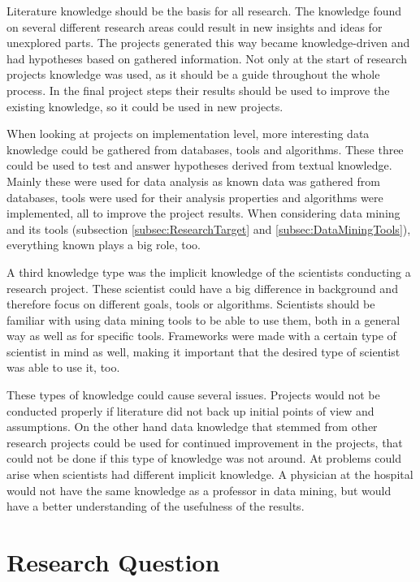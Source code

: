 \documentclass[10pt,a4paper]{article}
\begin{document}
	Literature knowledge should be the basis for all research. The knowledge found on several different research areas could result in new insights and ideas for unexplored parts. The projects generated this way became knowledge-driven and had hypotheses based on gathered information.\cite{bellazzi2011data} Not only at the start of research projects knowledge was used, as it should be a guide throughout the whole process. In the final project steps their results should be used to improve the existing knowledge, so it could be used in new projects.\cite{zupan2006knowledge}
	
	When looking at projects on implementation level, more interesting data knowledge could be gathered from databases, tools and algorithms. These three could be used to test and answer hypotheses derived from textual knowledge. Mainly these were used for data analysis as known data was gathered from databases, tools were used for their analysis properties and algorithms were implemented, all to improve the project results. When considering data mining and its tools (subsection \ref{subsec:ResearchTarget} and \ref{subsec:DataMiningTools}), everything known plays a big role, too.\cite{bellazzi2011data}
	
	A third knowledge type was the implicit knowledge of the scientists conducting a research project. These scientist could have a big difference in background and therefore focus on different goals, tools or algorithms. Scientists should be familiar with using data mining tools to be able to use them, both in a general way as well as for specific tools. Frameworks were made with a certain type of scientist in mind as well, making it important that the desired type of scientist was able to use it, too.\cite{zupan2006knowledge}

	These types of knowledge could cause several issues. Projects would not be conducted properly if literature did not back up initial points of view and assumptions. On the other hand data knowledge that stemmed from other research projects could be used for continued improvement in the projects, that could not be done if this type of knowledge was not around. At problems could arise when scientists had different implicit knowledge. A physician at the hospital would not have the same knowledge as a professor in data mining, but would have a better understanding of the usefulness of the results. 
	
	\section{Research Question}
	\label{sec:ResearchQuestion}
	
\end{document}
